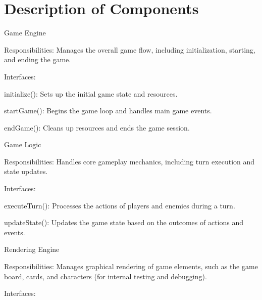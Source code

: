 \chapter{Description of Components}
\hypertarget{md_docs_2architecture_2component__diagram}{}\label{md_docs_2architecture_2component__diagram}
\label{md_docs_2architecture_2component__diagram_autotoc_md4}%
%

\begin{DoxyEnumerate}
\item Game Engine
\begin{DoxyItemize}
\item Responsibilities\+: Manages the overall game flow, including initialization, starting, and ending the game.
\item Interfaces\+:
\begin{DoxyItemize}
\item initialize()\+: Sets up the initial game state and resources.
\item start\+Game()\+: Begins the game loop and handles main game events.
\item end\+Game()\+: Cleans up resources and ends the game session.
\end{DoxyItemize}
\end{DoxyItemize}
\item Game Logic
\begin{DoxyItemize}
\item Responsibilities\+: Handles core gameplay mechanics, including turn execution and state updates.
\item Interfaces\+:
\begin{DoxyItemize}
\item execute\+Turn()\+: Processes the actions of players and enemies during a turn.
\item update\+State()\+: Updates the game state based on the outcomes of actions and events.
\end{DoxyItemize}
\end{DoxyItemize}
\item Rendering Engine
\begin{DoxyItemize}
\item Responsibilities\+: Manages graphical rendering of game elements, such as the game board, cards, and characters (for internal testing and debugging).
\item Interfaces\+:
\begin{DoxyItemize}

\end{DoxyItemize}
\end{DoxyItemize}
\end{DoxyEnumerate}
